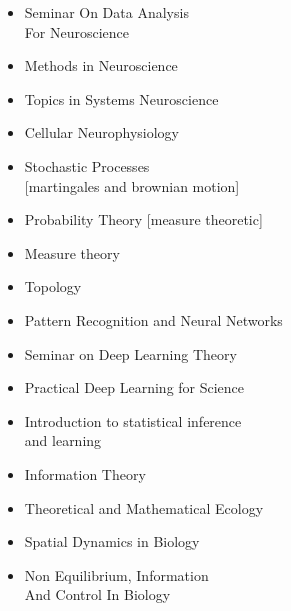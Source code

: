 
\begin{itemize}
\item Seminar On Data Analysis\\ For Neuroscience
\item Methods in Neuroscience	
\item Topics in Systems Neuroscience
\item Cellular Neurophysiology
\end{itemize}

\begin{itemize}
\item Stochastic Processes\\ {\small[martingales and brownian motion]}
\item Probability Theory {\small[measure theoretic]}
\item Measure theory
\item Topology
\end{itemize}

\begin{itemize}
\item Pattern Recognition and Neural Networks
\item Seminar on Deep Learning Theory
\item Practical Deep Learning for Science
\item Introduction to statistical inference \\ and learning
\item Information Theory
\end{itemize}


\begin{itemize}
\item Theoretical and Mathematical Ecology
\item Spatial Dynamics in Biology
\item Non Equilibrium, Information \\And Control In Biology
\end{itemize}



